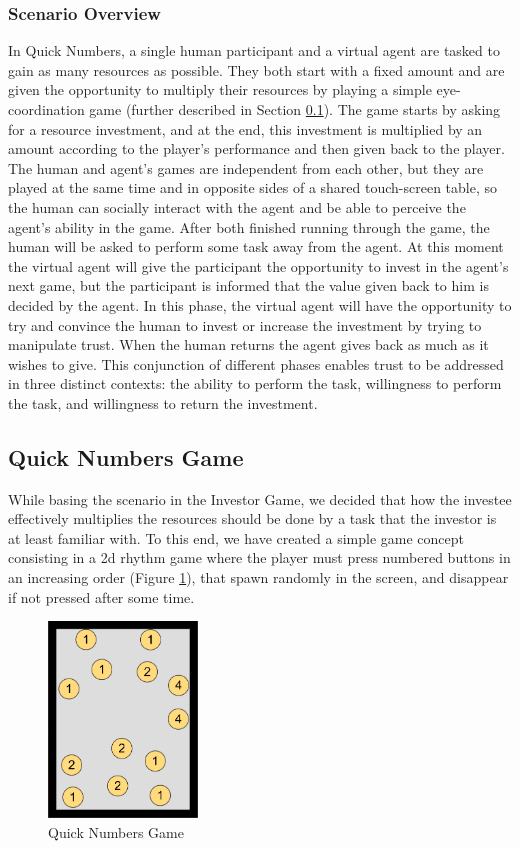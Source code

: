 \subsubsection{Scenario Overview}
\label{sub:ScenarioOverview}
In Quick Numbers, a single human participant and a virtual agent are tasked to gain as many resources as possible. They both start with a fixed amount and are given the opportunity to multiply their resources by playing a simple eye-coordination game (further described in Section \ref{sec:QuickNumbersGame}). The game starts by asking for a resource investment, and at the end, this investment is multiplied by an amount according to the player's performance and then given back to the player. The human and agent's games are independent from each other, but they are played at the same time and in opposite sides of a shared touch-screen table, so the human can socially interact with the agent and be able to perceive the agent's ability in the game. After both finished running through the game, the human will be asked to perform some task away from the agent. At this moment the virtual agent will give the participant the opportunity to invest in the agent's next game, but the participant is informed that the value given back to him is decided by the agent. In this phase, the virtual agent will have the opportunity to try and convince the human to invest or increase the investment by trying to manipulate trust. When the human returns the agent gives back as much as it wishes to give. This conjunction of different phases enables trust to be addressed in three distinct contexts: the ability to perform the task, willingness to perform the task, and willingness to return the investment. 


\subsection{Quick Numbers Game}
\label{sec:QuickNumbersGame}
While basing the scenario in the Investor Game, we decided that how the investee effectively multiplies the resources should be done by a task that the investor is at least familiar with. To this end, we have created a simple game concept consisting in a 2d rhythm game where the player must press numbered buttons in an increasing order (Figure \ref{fig:QuickNumbersGame}), that spawn randomly in the screen, and disappear if not pressed after some time.

\begin{figure}[hbt]
    \centering
    \includegraphics[width=150px]{figures/FallingBoltsDiagram.png}
    \caption{Quick Numbers Game}
    \label{fig:QuickNumbersGame}
\end{figure}

